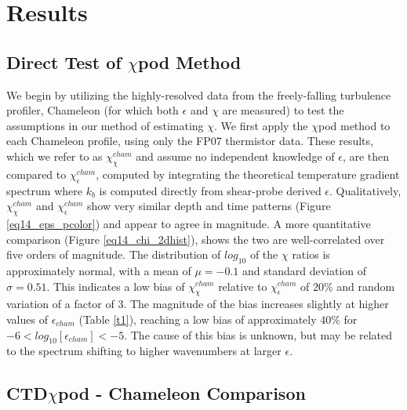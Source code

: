 \documentclass{ametsoc}
\begin{document}
\section{Results }


\subsection{Direct Test of $\chi$pod Method}

We begin by utilizing the highly-resolved data from the freely-falling turbulence profiler, Chameleon (for which both $\epsilon$ and $\chi$ are measured) to test the assumptions in our method of estimating $\chi$. We first apply the $\chi$pod method to each Chameleon profile, using only the FP07 thermistor data. These results, which we refer to as $\chi_{\chi}^{cham}$ and assume no independent knowledge of $\epsilon$, are then compared to $\chi_{\epsilon}^{cham}$, computed by integrating the theoretical temperature gradient spectrum where $k_b$ is computed directly from shear-probe derived $\epsilon$. Qualitatively, $\chi_{\chi}^{cham}$ and $\chi_{\epsilon}^{cham}$ show very similar depth and time patterns (Figure \ref{eq14_eps_pcolor}) and appear to agree in magnitude. A more quantitative comparison (Figure \ref{eq14_chi_2dhist}), shows the two are well-correlated over five orders of magnitude. The distribution of $log_{10}$ of the $\chi$ ratios is approximately normal, with a mean of $\mu=-0.1$ and standard deviation of $\sigma=0.51$. This indicates a low bias of $\chi_{\chi}^{cham}$ relative to $\chi_{\epsilon}^{cham}$ of 20\% and random variation of a factor of 3. The magnitude of the bias increases slightly at higher values of $\epsilon_{cham}$ (Table \ref{t1}), reaching a low bias of approximately 40$\%$ for $-6<log_{10}[\epsilon_{cham}]<-5$. The cause of this bias is unknown, but may be related to the spectrum shifting to higher wavenumbers at larger $\epsilon$. 



\subsection{ CTD$\chi$pod - Chameleon Comparison}
\end{document}
